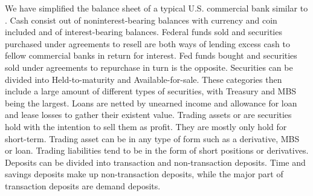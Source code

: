 \documentclass[12pt, a4paper]{article} %
\begin{document}
We have simplified the balance sheet of a typical U.S. commercial bank similar to \cite{DrechslerSchnabel2017}. Cash consist out of noninterest-bearing balances with currency and coin included and of interest-bearing balances.
Federal funds sold and securities purchased under agreements to resell are both ways of lending excess cash to fellow commercial banks in return for interest. Fed funds bought and securities sold under agreements to repurchase in turn is the opposite. Securities can be divided into Held-to-maturity and Available-for-sale. These categories then include a large amount of different types of securities, with Treasury and MBS being the largest. Loans are netted by unearned income and allowance for loan and lease losses to gather their existent value. Trading assets or  are securities hold with the intention to sell them as profit. They are mostly only hold for short-term. Trading asset can be in any type of form such as a derivative, MBS or loan. Trading liabilities tend to be in the form of short positions or derivatives. Deposits can be divided into transaction and non-transaction deposits. Time and savings deposits make up non-transaction deposits, while the major part of transaction deposits are demand deposits.
 
\end{document}
